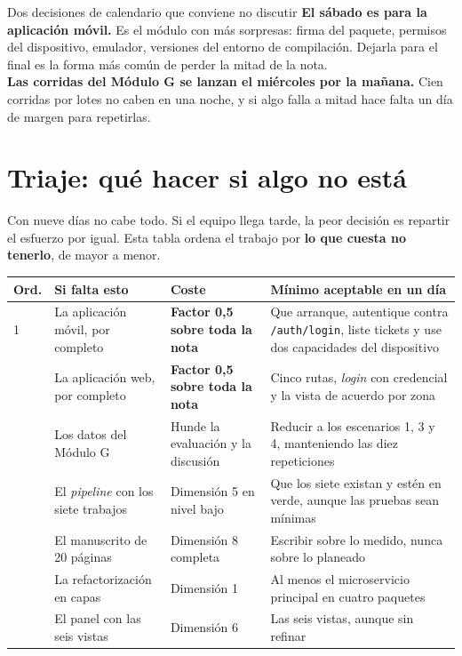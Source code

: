 \documentclass[11pt,a4paper]{article}
\begin{document}
\begin{avisoBox}{Dos decisiones de calendario que conviene no discutir}
	\textbf{El sábado es para la aplicación móvil.} Es el módulo con más sorpresas: firma del paquete, permisos del dispositivo, emulador, versiones del entorno de compilación. Dejarla para el final es la forma más común de perder la mitad de la nota.\\[5pt]
	\textbf{Las corridas del Módulo G se lanzan el miércoles por la mañana.} Cien corridas por lotes no caben en una noche, y si algo falla a mitad hace falta un día de margen para repetirlas.
\end{avisoBox}

\section{Triaje: qué hacer si algo no está}

Con nueve días no cabe todo. Si el equipo llega tarde, la peor decisión es repartir el esfuerzo por igual. Esta tabla ordena el trabajo por \textbf{lo que cuesta no tenerlo}, de mayor a menor.

\begin{center}
	\small
	\begin{longtable}{@{}p{0.9cm}p{5.4cm}p{3.0cm}p{5.0cm}@{}}
		\toprule
		\textbf{Ord.} & \textbf{Si falta esto} & \textbf{Coste} & \textbf{Mínimo aceptable en un día} \\
		\midrule
		\endhead
		1 & La aplicación móvil, por completo & \textbf{Factor 0,5 sobre toda la nota} & Que arranque, autentique contra \texttt{/auth/login}, liste tickets y use dos capacidades del dispositivo \\
		\addlinespace
		2 & La aplicación web, por completo & \textbf{Factor 0,5 sobre toda la nota} & Cinco rutas, \emph{login} con credencial y la vista de acuerdo por zona \\
		\addlinespace
		3 & Los datos del Módulo G & Hunde la evaluación y la discusión & Reducir a los escenarios 1, 3 y 4, manteniendo las diez repeticiones \\
		\addlinespace
		4 & El \emph{pipeline} con los siete trabajos & Dimensión 5 en nivel bajo & Que los siete existan y estén en verde, aunque las pruebas sean mínimas \\
		\addlinespace
		5 & El manuscrito de 20 páginas & Dimensión 8 completa & Escribir sobre lo medido, nunca sobre lo planeado \\
		\addlinespace
		6 & La refactorización en capas & Dimensión 1 & Al menos el microservicio principal en cuatro paquetes \\
		\addlinespace
		7 & El panel con las seis vistas & Dimensión 6 & Las seis vistas, aunque sin refinar \\
		\bottomrule
	\end{longtable}
\end{center}
\end{document}
